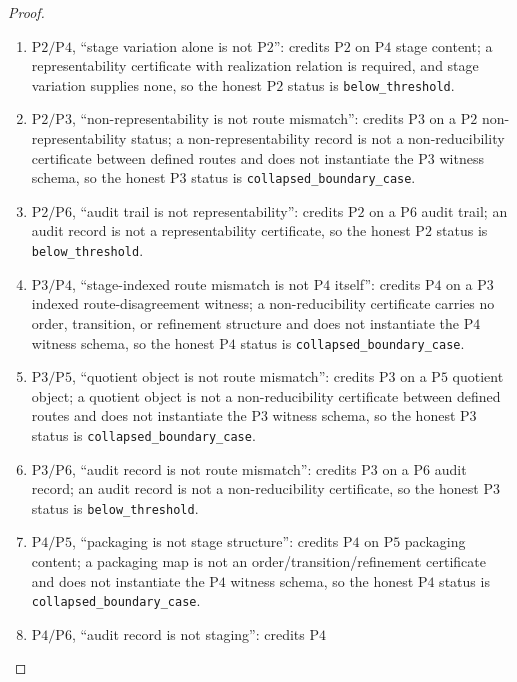 \documentclass[11pt]{article}
\theoremstyle{definition}
\newcommand{\belowthr}{\texttt{below\_threshold}}
\newcommand{\collapsedbc}{\texttt{collapsed\_boundary\_case}}
\newcommand{\Ptwo}{\ensuremath{\mathrm{P2}}}
\newcommand{\Pthree}{\ensuremath{\mathrm{P3}}}
\newcommand{\Pfour}{\ensuremath{\mathrm{P4}}}
\newcommand{\Pfive}{\ensuremath{\mathrm{P5}}}
\newcommand{\Psix}{\ensuremath{\mathrm{P6}}}
\begin{document}
\begin{proof}
\begin{enumerate}[topsep=2pt,itemsep=2pt,label=\textup{(\arabic*)}]
    realization relation beyond quotient equality that makes the \Ptwo{} content
    nontrivial is absent from the packaging map, so the honest \Ptwo{} status is
    \belowthr{}. (In the trivial case the row permits the coincidence and
    forbids nothing.)
  \item \(\Ptwo{}/\Pfour{}\), ``stage variation alone is not \Ptwo{}'':
    credits \Ptwo{} on \Pfour{} stage content; a representability certificate
    with realization relation is required, and stage variation supplies none, so
    the honest \Ptwo{} status is \belowthr{}.
  \item \(\Ptwo{}/\Pthree{}\), ``non-representability is not route mismatch'':
    credits \Pthree{} on a \Ptwo{} non-representability status; a
    non-representability record is not a non-reducibility certificate between
    defined routes and does not instantiate the \Pthree{} witness schema, so the
    honest \Pthree{} status is \collapsedbc{}.
  \item \(\Ptwo{}/\Psix{}\), ``audit trail is not representability'': credits
    \Ptwo{} on a \Psix{} audit trail; an audit record is not a representability
    certificate, so the honest \Ptwo{} status is \belowthr{}.
  \item \(\Pthree{}/\Pfour{}\), ``stage-indexed route mismatch is not \Pfour{}
    itself'': credits \Pfour{} on a \Pthree{} indexed route-disagreement
    witness; a non-reducibility certificate carries no order, transition, or
    refinement structure and does not instantiate the \Pfour{} witness schema,
    so the honest \Pfour{} status is \collapsedbc{}.
  \item \(\Pthree{}/\Pfive{}\), ``quotient object is not route mismatch'':
    credits \Pthree{} on a \Pfive{} quotient object; a quotient object is not a
    non-reducibility certificate between defined routes and does not instantiate
    the \Pthree{} witness schema, so the honest \Pthree{} status is
    \collapsedbc{}.
  \item \(\Pthree{}/\Psix{}\), ``audit record is not route mismatch'': credits
    \Pthree{} on a \Psix{} audit record; an audit record is not a
    non-reducibility certificate, so the honest \Pthree{} status is
    \belowthr{}.
  \item \(\Pfour{}/\Pfive{}\), ``packaging is not stage structure'': credits
    \Pfour{} on \Pfive{} packaging content; a packaging map is not an
    order/transition/refinement certificate and does not instantiate the
    \Pfour{} witness schema, so the honest \Pfour{} status is \collapsedbc{}.
  \item \(\Pfour{}/\Psix{}\), ``audit record is not staging'': credits \Pfour{}

\end{enumerate}
\end{proof}
\end{document}
